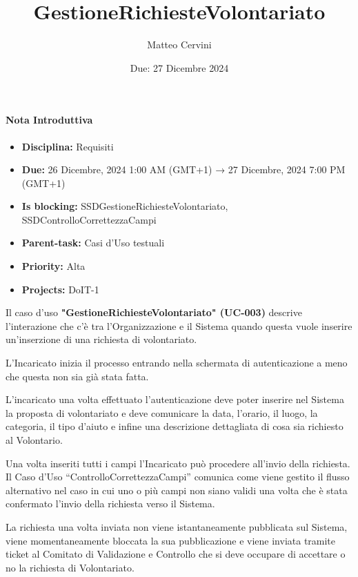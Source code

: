 \title{GestioneRichiesteVolontariato}
\author{Matteo Cervini}
\date{Due: 27 Dicembre 2024}

\maketitle

\paragraph*{Nota Introduttiva}
\begin{itemize}
    \item \textbf{Disciplina:} Requisiti
    \item \textbf{Due:} 26 Dicembre, 2024 1:00 AM (GMT+1) → 27 Dicembre, 2024 7:00 PM (GMT+1)
    \item \textbf{Is blocking:} SSDGestioneRichiesteVolontariato, SSDControlloCorrettezzaCampi
    \item \textbf{Parent-task:} Casi d'Uso testuali
    \item \textbf{Priority:} Alta
    \item \textbf{Projects:} DoIT-1
    \end{itemize}

Il caso d'uso \textbf{"GestioneRichiesteVolontariato" (UC-003)} descrive l'interazione che c'è tra l'Organizzazione e il Sistema quando questa vuole inserire un'inserzione di una richiesta di volontariato.

L'Incaricato inizia il processo entrando nella schermata di autenticazione a meno che questa non sia già stata fatta. 

L'incaricato una volta effettuato l'autenticazione deve poter inserire nel Sistema la proposta di volontariato e deve comunicare la data, l'orario, il luogo, la categoria, il tipo d'aiuto e infine una descrizione dettagliata di cosa sia richiesto al Volontario.

Una volta inseriti tutti i campi l'Incaricato può procedere all'invio della richiesta. Il Caso d'Uso ``ControlloCorrettezzaCampi'' comunica come viene gestito il flusso alternativo nel caso in cui uno o più campi non siano validi una volta che è stata confermato l'invio della richiesta verso il Sistema.

La richiesta una volta inviata non viene istantaneamente pubblicata sul Sistema, viene momentaneamente bloccata la sua pubblicazione e viene inviata tramite ticket al Comitato di Validazione e Controllo che si deve occupare di accettare o no la richiesta di Volontariato.

